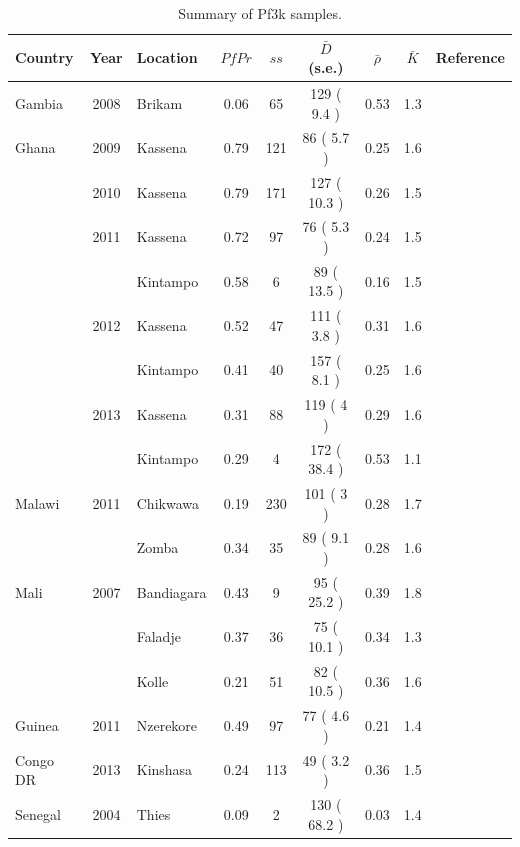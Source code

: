 \documentclass[9pt,lineno]{elife}
\begin{document}
\begin{table}[btp]
  \caption{Summary of Pf3k samples.}\label{tab:Pf3k}
{\small
\begin{tabular}{p{1.3cm} c p{1.8cm} c | c c c c p{2.7cm}}
\toprule\hline
Country         &   Year  &Location  & $PfPr$ & $ss$   & $\bar{D}$ (s.e.)  & $\bar{\rho}$ & $\bar{K}$& Reference\\
\midrule
Gambia          &    2008 & Brikam   & 0.06   & 65     & 129 ( 9.4 )  & 0.53 & 1.3 &\citet{Amambua-Ngwa2012}\\
\hline
Ghana           &    2009 & Kassena & 0.79 & 121 & 86 ( 5.7 )& 0.25 & 1.6&\multirow{3}{*}{\parbox{3.4cm}{\citet{Duffy2015,Kamau2015,eLife2016}}}\\
                & 2010 & Kassena & 0.79 & 171 & 127 ( 10.3 )& 0.26 & 1.5 &\\
                & 2011 & Kassena & 0.72 & 97 & 76 ( 5.3 )& 0.24 & 1.5& \\
                &      & Kintampo & 0.58 & 6 & 89 ( 13.5 )& 0.16 & 1.5&\\
                & 2012 & Kassena & 0.52 & 47 & 111 ( 3.8 )& 0.31 & 1.6&\\
                &      & Kintampo & 0.41 & 40 & 157 ( 8.1 )& 0.25 & 1.6&\\
                & 2013 & Kassena & 0.31 & 88 & 119 ( 4 )& 0.29 & 1.6&\\
                &      & Kintampo & 0.29 & 4 & 172 ( 38.4 )& 0.53 & 1.1&\\
\hline
Malawi & 2011 & Chikwawa & 0.19 & 230 & 101 ( 3 )& 0.28 & 1.7 &\citet{Ocholla2014}\\
       &      & Zomba & 0.34 & 35 & 89 ( 9.1 )& 0.28 & 1.6 &\\
\hline
Mali & 2007 & Bandiagara & 0.43 & 9 & 95 ( 25.2 )& 0.39 & 1.8  &\multirow{3}{*}{\parbox{3.4cm}{\citet{eLife2016}}}\\
     &      & Faladje & 0.37 & 36 & 75 ( 10.1 )& 0.34 & 1.3 &\\
     &      & Kolle & 0.21 & 51 & 82 ( 10.5 )& 0.36 & 1.6 &\\
\cline{1-8}
Guinea & 2011 & Nzerekore & 0.49 & 97 & 77 ( 4.6 )& 0.21 & 1.4 &\\
\cline{1-8}
Congo DR        & 2013 & Kinshasa & 0.24 & 113 & 49 ( 3.2 )& 0.36 & 1.5\\
\hline
Senegal & 2004 & Thies & 0.09 & 2 & 130 ( 68.2 )& 0.03 & 1.4  &\citet{Wong2017}\\

\end{tabular}}
\end{table}
\end{document}
